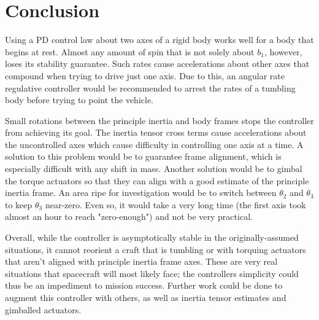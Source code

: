 \documentclass[paper]{aiaaNew}
\begin{document}
\section{Conclusion}
Using a PD control law about two axes of a rigid body works well for a body that begins at rest. Almost any amount of spin that is not solely about $b_1$, however, loses its stability guarantee.  Such rates cause accelerations about other axes that compound when trying to drive just one axis.  Due to this, an angular rate regulative controller would be recommended to arrest the rates of a tumbling body before trying to point the vehicle.  
\par
Small rotations between the principle inertia and body frames stops the controller from achieving its goal.  The inertia tensor cross terms cause accelerations about the uncontrolled axes which cause difficulty in controlling one axis at a time.  A solution to this problem would be to guarantee frame alignment, which is especially difficult with any shift in mass.  Another solution would be to gimbal the torque actuators so that they can align with a good estimate of the principle inertia frame. An area ripe for investigation would be to switch between $\theta_2$ and $\theta_3$ to keep $\theta_3$ near-zero.  Even so, it would take a very long time (the first axis took almost an hour to reach "zero-enough") and not be very practical.
\par
Overall, while the controller is asymptotically stable in the originally-assumed situations, it cannot reorient a craft that is tumbling or with torquing actuators that aren't aligned with principle inertia frame axes. These are very real situations that spacecraft will most likely face; the controllers simplicity could thus be an impediment to mission success.  Further work could be done to augment this controller with others, as well as inertia tensor estimates and gimballed actuators.

\end{document}
